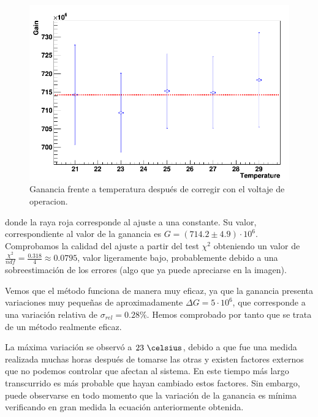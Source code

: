\begin{figure}[hbtp]
\centering
\includegraphics[scale=0.4]{compensacion.png}
\caption{Ganancia frente a temperatura después de corregir con el voltaje de operacion.\label{compensacion}}
\end{figure}
donde la raya roja corresponde al ajuste a una constante. Su valor, correspondiente al valor de la ganancia es $G=(714.2 \pm 4.9) \cdot 10^6$. Comprobamos la calidad del ajuste a partir del test $\chi^2$ obteniendo un valor de $\frac{\chi^2}{ndf}=\frac{0.318}{4}\approx 0.0795$, valor ligeramente bajo, probablemente debido a una sobreestimación de los errores (algo que ya puede apreciarse en la imagen).

Vemos que el método funciona de manera muy eficaz, ya que la ganancia presenta variaciones muy pequeñas de aproximadamente $\Delta G=5 \cdot 10^6$, que corresponde a una variación relativa de $\sigma_{rel}=0.28\%$. Hemos comprobado por tanto que se trata de un método realmente eficaz.

La máxima variación se observó a $23~\celsius$, debido a que fue una medida realizada muchas horas después de tomarse las otras y existen factores externos que no podemos controlar que afectan al sistema. En este tiempo más largo transcurrido es más probable que hayan cambiado estos factores. Sin embargo, puede observarse en todo momento que la variación de la ganancia es mínima verificando en gran medida la ecuación anteriormente obtenida.

